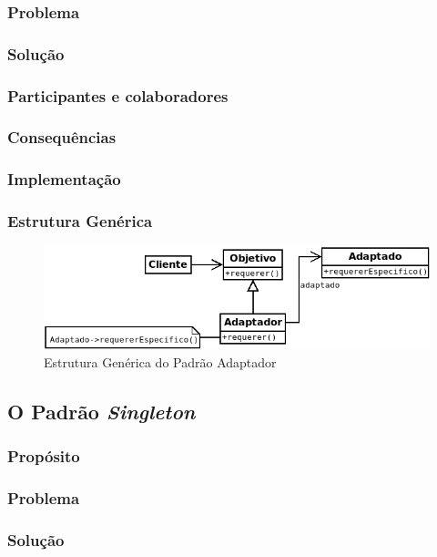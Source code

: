 \subsubsection{Problema}
\subsubsection{Solução}
\subsubsection{Participantes e colaboradores}
\subsubsection{Consequências}
\subsubsection{Implementação}
\subsubsection{Estrutura Genérica}

\begin{figure}[h]
\begin{center}
\includegraphics[scale=0.6]{adaptador.png}
\caption{Estrutura Genérica do Padrão Adaptador}\label{fig:adaptador}
\end{center}
\end{figure}

\subsection{O Padrão \textit{Singleton}}
\subsubsection{Propósito}
\subsubsection{Problema}
\subsubsection{Solução}
